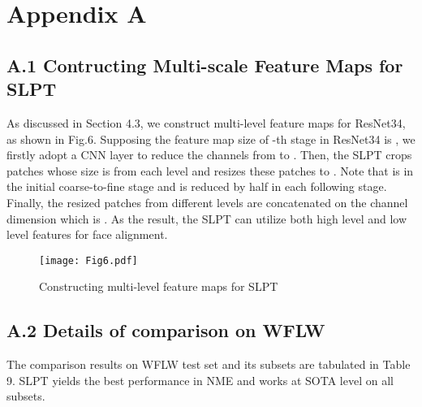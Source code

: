 \documentclass[10pt,twocolumn,letterpaper]{article}
\begin{document}
\newpage
 

{\small


}

\newpage
\onecolumn
\section*{Appendix A}

\subsection*{A.1 Contructing Multi-scale Feature Maps for SLPT}

As discussed in Section 4.3, we construct multi-level feature maps for ResNet34, as shown in Fig.6. Supposing the feature map size of -th stage in ResNet34 is , we firstly adopt a  CNN layer to reduce the channels from  to . Then, the SLPT crops  patches whose size is  from each level and resizes these patches to . Note that  is  in the initial coarse-to-fine stage and is reduced by half in each following stage. Finally, the resized patches from different levels are concatenated on the channel dimension which is . As the result, the SLPT can utilize both high level and low level features for face alignment.

\begin{figure}[H]
	\centering
	\texttt{[image: Fig6.pdf]}
	\caption{Constructing multi-level feature maps for SLPT}
	\label{fig6}
\end{figure}


\subsection*{A.2 Details of comparison on WFLW}

The comparison results on WFLW test set and its subsets are tabulated in Table 9. SLPT yields the best performance in NME and works at SOTA level on all subsets.
\end{document}
